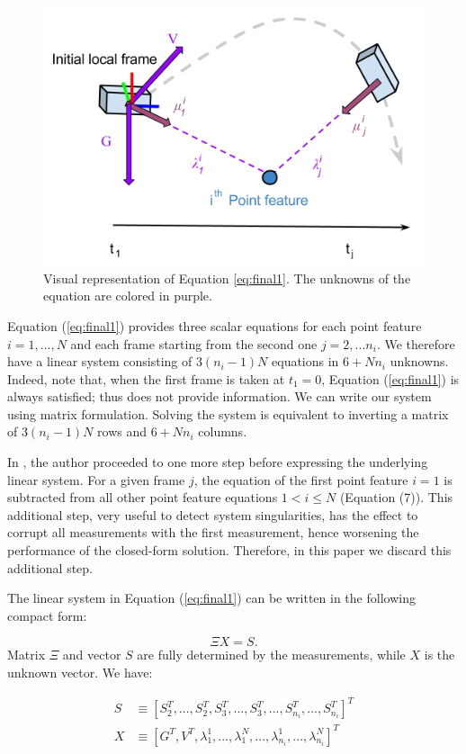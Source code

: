\documentclass[letterpaper, 10 pt, conference]{ieeeconf}  %
\begin{document}
\begin{figure}
  \centering
  \includegraphics[width=0.7\columnwidth, trim={0 2cm 0 0}, clip]{images/closedFormExplained}
  \caption{Visual representation of Equation \ref{eq:final1}.
  The unknowns of the equation are colored in \textcolor{amethyst}{purple}.}
\end{figure}

Equation (\ref{eq:final1}) provides three scalar equations for each point feature $i=1,...,N$ and each frame starting from the second one $j=2,...n_i$.
We therefore have a linear system consisting of $3(n_i-1)N$ equations in $6 + Nn_i$ unknowns.
Indeed, note that, when the first frame is taken at $t_1 = 0$,
Equation (\ref{eq:final1}) is always satisfied; thus does not provide information.
We can write our system using matrix formulation.
Solving the system is equivalent to inverting a matrix of $3(n_i-1)N$ rows and $6+Nn_i$ columns.

In \cite{Martinelli2014}, the author proceeded to one more step before expressing the underlying linear system.
For a given frame $j$, the equation of the first point feature $i=1$ is subtracted from all other point feature equations $1<i \leq N$ (Equation (7)).
This additional step, very useful to detect system singularities, has the effect to corrupt all measurements with the first measurement,
hence worsening the performance of the closed-form solution. Therefore,
in this paper we discard this additional step.

The linear system in Equation (\ref{eq:final1}) can be written in the following compact form:

\begin{equation}
\label{eq:mat1}
\Xi X = S.
\end{equation}
\noindent Matrix $\Xi$ and vector $S$ are fully determined by the measurements, while $X$ is the unknown vector.
We have:

\begin{equation*}
  \begin{aligned}
S &\equiv [S_2^T, ...,S_2^T, S_3^T,...,S_3^T,...,S_{n_i}^T,...,S_{n_i}^T]^T \\
X &\equiv [ G^T, V^T, \lambda_1^1, ..., \lambda_1^N, ..., \lambda_{n_i}^1, ..., \lambda_{n_i}^N]^T
  \end{aligned}
\end{equation*}
\vspace{-1cm}
\end{document}
